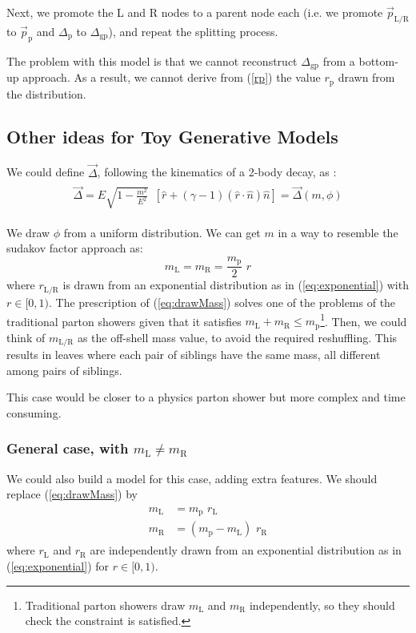 \documentclass[12pt]{article}
\def\beq{\begin{equation}}
\def\eeq{\end{equation}}
\def\beq{\begin{equation}}
\def\eeq{\end{equation}}
\newcommand{\bea}{\begin{eqnarray}\begin{aligned}}
\newcommand{\eea}{\end{aligned}\end{eqnarray}}
\begin{document}
Next, we promote the L and R nodes to a parent node each (i.e. we promote $\vec{p}_\text{L/R}$ to $\vec{p}_\text{p}$ and $\Delta_\text{p}$ to $\Delta_\text{gp}$), and repeat the splitting process.


The problem with this model is that we cannot reconstruct $\Delta_\text{gp}$ from a bottom-up approach. As a result, we cannot derive from (\ref{rp}) the value $r_\text{p}$  drawn from the distribution. 


\subsection{Other ideas for Toy Generative Models}

We could define $\vec{\Delta}$, following the kinematics of a 2-body decay, as :
\bea
 \vec{\Delta}   = E \sqrt{1-\frac{m^2}{E^2}} \,\,\,[ \hat{r} + (\gamma -1) (\hat{r} \cdot \hat{n}) \hat{n} ] = \vec{\Delta}(m,\phi)
\eea

We draw $\phi$ from a uniform distribution. We can get $m$ in a way to resemble the sudakov factor approach as:
\beq\label{eq:drawMass}
m_{\text{L}} = m_{\text{R}} = \frac{m_{\text{p}}}{2}\,\,  r 
\eeq
where $r_{\text{L/R}}$ is drawn from an exponential distribution as in (\ref{eq:exponential}) with $r \in [0,1)$. The prescription of (\ref{eq:drawMass}) solves one of the problems of the traditional parton showers given that it satisfies $m_{\text{L}} + m_{\text{R}} \leq m_{\text{p}}$\footnote{Traditional parton showers draw $m_{\text{L}}$ and $m_{\text{R}}$ independently, so they should check the constraint is satisfied.}. Then, we could think of $m_{\text{L/R}}$ as the off-shell mass value, to avoid the required reshuffling. This results in leaves where each pair of siblings have the same mass, all different among pairs of siblings.


This case would be closer to a physics parton shower but more complex and time consuming.

\subsubsection{General case, with  $m_{\text{L}}\neq m_{\text{R}}$}

We could also build a model for this case, adding extra features. 
We should replace (\ref{eq:drawMass}) by
\bea
m_{\text{L}} &= m_{\text{p}}\,\,  r_{\text{L}}  \\
m_{\text{R}} &= (m_{\text{p}}-m_{\text{L}})\,\,  r_{\text{R}}
\eea
where $r_{\text{L}}$ and $r_{\text{R}}$ are independently drawn from an exponential distribution as in (\ref{eq:exponential}) for $r \in [0,1)$.
\end{document}
